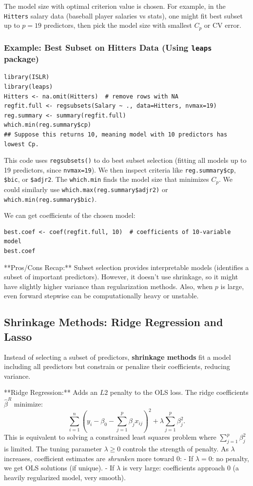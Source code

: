 \documentclass[11pt]{article}
\begin{document}
The model size with optimal criterion value is chosen. For example, in the \texttt{Hitters} salary data (baseball player salaries vs stats), one might fit best subset up to $p=19$ predictors, then pick the model size with smallest $C_p$ or CV error.

\subsubsection*{Example: Best Subset on Hitters Data (Using \texttt{leaps} package)}
\begin{verbatim}
library(ISLR)
library(leaps)
Hitters <- na.omit(Hitters)  # remove rows with NA
regfit.full <- regsubsets(Salary ~ ., data=Hitters, nvmax=19)
reg.summary <- summary(regfit.full)
which.min(reg.summary$cp)
## Suppose this returns 10, meaning model with 10 predictors has lowest Cp.
\end{verbatim}
This code uses \texttt{regsubsets()} to do best subset selection (fitting all models up to 19 predictors, since \texttt{nvmax=19}). We then inspect criteria like \texttt{reg.summary\$cp}, \texttt{\$bic}, or \texttt{\$adjr2}. The \texttt{which.min} finds the model size that minimizes $C_p$. We could similarly use \texttt{which.max(reg.summary\$adjr2)} or \texttt{which.min(reg.summary\$bic)}.

We can get coefficients of the chosen model:
\begin{verbatim}
best.coef <- coef(regfit.full, 10)  # coefficients of 10-variable model
best.coef
\end{verbatim}

**Pros/Cons Recap:** Subset selection provides interpretable models (identifies a subset of important predictors). However, it doesn't use shrinkage, so it might have slightly higher variance than regularization methods. Also, when $p$ is large, even forward stepwise can be computationally heavy or unstable.

\subsection{Shrinkage Methods: Ridge Regression and Lasso}
Instead of selecting a subset of predictors, \textbf{shrinkage methods} fit a model including all predictors but constrain or penalize their coefficients, reducing variance.

**Ridge Regression:** Adds an $L2$ penalty to the OLS loss. The ridge coefficients $\hat\beta^{R}$ minimize:
\[ \sum_{i=1}^n (y_i - \beta_0 - \sum_{j=1}^p \beta_j x_{ij})^2 + \lambda \sum_{j=1}^p \beta_j^2. \]
This is equivalent to solving a constrained least squares problem where $\sum_{j=1}^p \beta_j^2$ is limited. The tuning parameter $\lambda \ge 0$ controls the strength of penalty. As $\lambda$ increases, coefficient estimates are \textit{shrunken} more toward 0:
- If $\lambda=0$: no penalty, we get OLS solutions (if unique).
- If $\lambda$ is very large: coefficients approach 0 (a heavily regularized model, very smooth).
\end{document}
